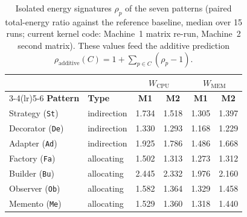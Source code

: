 \begin{table}[t]
\caption{Isolated energy signatures $\rho_p$ of the seven patterns (paired total-energy ratio against the reference baseline, median over 15 runs; current kernel code: Machine~1 matrix re-run, Machine~2 second matrix). These values feed the additive prediction $\rho_{\text{additive}}(C) = 1 + \sum_{p \in C}(\rho_p - 1)$.}
\label{tab:signatures}
\centering \small
\begin{tabular}{llcccc}
\toprule
& & \multicolumn{2}{c}{$W_{\text{CPU}}$} & \multicolumn{2}{c}{$W_{\text{MEM}}$}\\
\cmidrule(lr){3-4}\cmidrule(lr){5-6}
\textbf{Pattern} & \textbf{Type} & \textbf{M1} & \textbf{M2} & \textbf{M1} & \textbf{M2}\\
\midrule
Strategy (\texttt{St}) & indirection & 1.734 & 1.518 & 1.305 & 1.397\\
Decorator (\texttt{De}) & indirection & 1.330 & 1.293 & 1.168 & 1.229\\
Adapter (\texttt{Ad}) & indirection & 1.925 & 1.786 & 1.486 & 1.668\\
\midrule
Factory (\texttt{Fa}) & allocating & 1.502 & 1.313 & 1.273 & 1.312\\
Builder (\texttt{Bu}) & allocating & 2.445 & 2.332 & 1.976 & 2.160\\
Observer (\texttt{Ob}) & allocating & 1.582 & 1.364 & 1.329 & 1.458\\
Memento (\texttt{Me}) & allocating & 1.529 & 1.360 & 1.318 & 1.440\\
\bottomrule
\end{tabular}
\end{table}
